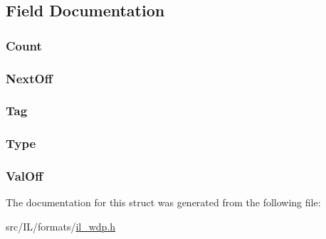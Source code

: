 \subsection{Field Documentation}
\hypertarget{struct_w_d_p_i_f_d_ae47966249258ef1f08430444cdca8892}{
\subsubsection[{Count}]{ Count}}\label{struct_w_d_p_i_f_d_ae47966249258ef1f08430444cdca8892}
\hypertarget{struct_w_d_p_i_f_d_ac0a76550a70ae0506e227006e39733f9}{
\subsubsection[{Next\-Off}]{ Next\-Off}}\label{struct_w_d_p_i_f_d_ac0a76550a70ae0506e227006e39733f9}
\hypertarget{struct_w_d_p_i_f_d_a7a0d1fd108b56c4d85eb221c709db9a8}{
\subsubsection[{Tag}]{ Tag}}\label{struct_w_d_p_i_f_d_a7a0d1fd108b56c4d85eb221c709db9a8}
\hypertarget{struct_w_d_p_i_f_d_af4653b5eec325c51981a48f69efdcd25}{
\subsubsection[{Type}]{ Type}}\label{struct_w_d_p_i_f_d_af4653b5eec325c51981a48f69efdcd25}
\hypertarget{struct_w_d_p_i_f_d_ab8657de8ff64d504446fe29515ca73b0}{
\subsubsection[{Val\-Off}]{ Val\-Off}}\label{struct_w_d_p_i_f_d_ab8657de8ff64d504446fe29515ca73b0}


The documentation for this struct was generated from the following file\-:\begin{DoxyCompactItemize}
\item 
src/\-I\-L/formats/\hyperlink{il__wdp_8h}{il\-\_\-wdp.\-h}\end{DoxyCompactItemize}
